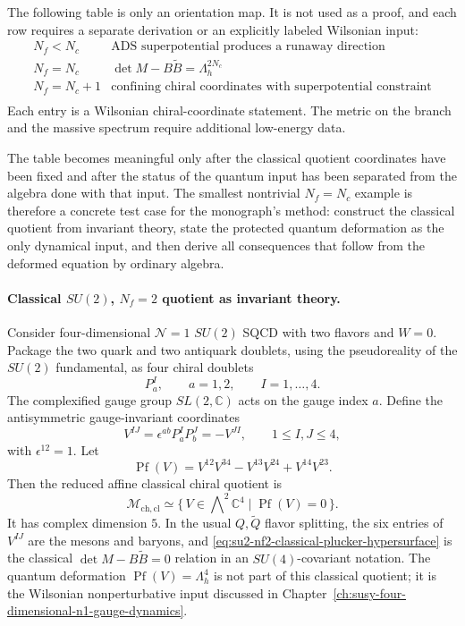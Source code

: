 The following table is only an orientation map.  It is not used as a proof,
and each row requires a separate derivation or an explicitly labeled
Wilsonian input:
\[
\begin{array}{c|c}
N_f<N_c & \text{ADS superpotential produces a runaway direction}\\
N_f=N_c & \det M-B\widetilde B=\Lambda_h^{2N_c}\\
N_f=N_c+1 & \text{confining chiral coordinates with superpotential constraint}\\
\end{array}
\]
Each entry is a Wilsonian chiral-coordinate statement.  The metric on the
branch and the massive spectrum require additional low-energy data.

The table becomes meaningful only after the classical quotient coordinates
have been fixed and after the status of the quantum input has been separated
from the algebra done with that input.  The smallest nontrivial
\(N_f=N_c\) example is therefore a concrete test case for the monograph's
method: construct the
classical quotient from invariant theory, state the protected quantum
deformation as the only dynamical input, and then derive all consequences
that follow from the deformed equation by ordinary algebra.

\paragraph{Classical \(SU(2)\), \(N_f=2\) quotient as invariant theory.}
Consider four-dimensional \(\mathcal N=1\) \(SU(2)\) SQCD with two flavors
and \(W=0\).  Package the two quark and two antiquark doublets, using the
pseudoreality of the \(SU(2)\) fundamental, as four chiral doublets
\[
  P_a^I,\qquad a=1,2,\qquad I=1,\ldots,4 .
\]
The complexified gauge group \(SL(2,\mathbb C)\) acts on the gauge index
\(a\).  Define the antisymmetric gauge-invariant coordinates
\begin{equation}
  V^{IJ}=\epsilon^{ab}P_a^I P_b^J=-V^{JI},
  \qquad
  1\leq I,J\leq4,
  \label{eq:su2-nf2-meson-baryon-v-coordinates}
\end{equation}
with \(\epsilon^{12}=1\).  Let
\begin{equation}
  \operatorname{Pf}(V)
  =
  V^{12}V^{34}-V^{13}V^{24}+V^{14}V^{23}.
  \label{eq:su2-nf2-pfaffian-convention}
\end{equation}
Then the reduced affine classical chiral quotient is
\begin{equation}
  \mathcal M_{\mathrm{ch},\mathrm{cl}}
  \simeq
  \{\,V\in\bigwedge\nolimits^2\mathbb C^4
    \mid \operatorname{Pf}(V)=0\,\}.
  \label{eq:su2-nf2-classical-plucker-hypersurface}
\end{equation}
It has complex dimension \(5\).  In the usual \(Q,\widetilde Q\) flavor
splitting, the six entries of \(V^{IJ}\) are the mesons and baryons, and
\eqref{eq:su2-nf2-classical-plucker-hypersurface} is the classical
\(\det M-B\widetilde B=0\) relation in an \(SU(4)\)-covariant notation.
The quantum deformation \(\operatorname{Pf}(V)=\Lambda_h^4\) is not part of
this classical quotient; it is the Wilsonian nonperturbative input discussed
in Chapter~\ref{ch:susy-four-dimensional-n1-gauge-dynamics}.

